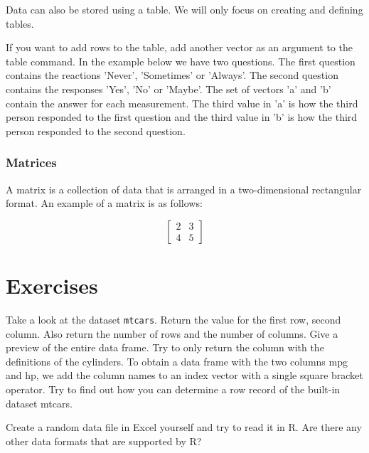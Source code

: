 Data can also be stored using a table. We will only focus on creating and defining tables.



If you want to add rows to the table, add another vector as an argument to the table command.
In the example below we have two questions.
The first question contains the reactions 'Never', 'Sometimes' or 'Always'.
The second question contains the responses 'Yes', 'No' or 'Maybe'.
The set of vectors 'a' and 'b' contain the answer for each measurement.
The third value in 'a' is how the third person responded to the first question and the third value in 'b' is how the third person responded to the second question.



\subsubsection{Matrices}

A matrix is a collection of data that is arranged in a two-dimensional rectangular format. An example of a matrix is as follows:

\[
\begin{bmatrix}
2 & 3 \\ 
4 & 5  
\end{bmatrix}
\]



\section{Exercises}

\begin{exercise}
    Take a look at the dataset \texttt{mtcars}. 
    Return the value for the first row, second column. Also return the number of rows and the number of columns.
    Give a preview of the entire data frame. Try to only return the column with the definitions of the cylinders.    
    To obtain a data frame with the two columns mpg and hp, we add the column names to an index vector with a single square bracket operator.
    Try to find out how you can determine a row record of the built-in dataset mtcars.
\end{exercise}

\begin{exercise}
    Create a random data file in Excel yourself and try to read it in R. 
    Are there any other data formats that are supported by R?
\end{exercise}

